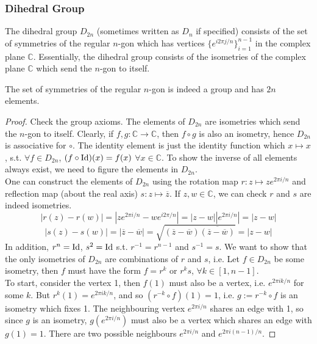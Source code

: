 \documentclass[a4paper]{article}
\begin{document}
\subsubsection*{Dihedral Group}
\begin{defi}
The dihedral group $D_{2n}$ (sometimes written as $D_n$ if specified) consists of the set of symmetries of the regular $n$-gon which has vertices $\{e^{i2\pi j/n}\}_{i=1}^{n-1}$ in the complex plane $\mathbb{C}$. Essentially, the dihedral group consists of the isometries of the complex plane $\mathbb{C}$ which send the $n$-gon to itself.
\end{defi}
\begin{thm}
The set of symmetries of the regular $n$-gon is indeed a group and has $2n$ elements.
\end{thm}
\begin{proof}
Check the group axioms. The elements of $D_{2n}$ are isometries which send the $n$-gon to itself. Clearly, if $f,g:\mathbb{C}\rightarrow\mathbb{C}$, then $f\circ g$ is also an isometry, hence $D_{2n}$ is associative for $\circ$. The identity element is just the identity function which $x\mapsto x$, s.t. $\forall f\in D_{2n}$, $(f\circ\operatorname{Id})(x)=f(x)$ $\forall x\in\mathbb{C}$. To show the inverse of all elements always exist, we need to figure the elements in $D_{2n}$.\\[5pt]
One can construct the elements of $D_{2n}$ using the rotation map $r: z\mapsto ze^{2\pi i/n}$ and reflection map (about the real axis) $s:z\mapsto\overline{z}$. If $z,w\in\mathbb{C}$, we can check $r$ and $s$ are indeed isometries.
$$|r(z)-r(w)|=|ze^{2\pi i/n}-we^{i2\pi /n}|=|z-w||e^{2\pi i/n}|=|z-w|$$
$$|s(z)-s(w)|=|\overline{z}-\overline{w}|=\sqrt{(\overline{z}-\overline{w})\overline{(\overline{z}-\overline{w})}}=|z-w|$$
In addition, $r^n=\operatorname{Id}$, $s^2=\operatorname{Id}$ s.t. $r^{-1}=r^{n-1}$ and $s^{-1}=s$. We want to show that the only isometries of $D_{2n}$ are combinations of $r$ and $s$, i.e. Let $f\in D_{2n}$ be some isometry, then $f$ must have the form $f=r^k$ or $r^ks$, $\forall k\in[1,n-1]$.\\[5pt]
To start, consider the vertex 1, then $f(1)$ must also be a vertex, i.e. $e^{2\pi ik/n}$ for some $k$. But $r^k(1)=e^{2\pi ik/n}$, and so $(r^{-k}\circ f)(1)=1$, i.e. $g:=r^{-k}\circ f$ is an isometry which fixes 1. The neighbouring vertex $e^{2\pi i/n}$ shares an edge with 1, so since $g$ is an isometry, $g(e^{2\pi i/n})$ must also be a vertex which shares an edge with $g(1)=1$. There are two possible neighbours $e^{2\pi i/n}$ and $e^{2\pi i(n-1)/n}$.

\end{proof}
\end{document}
